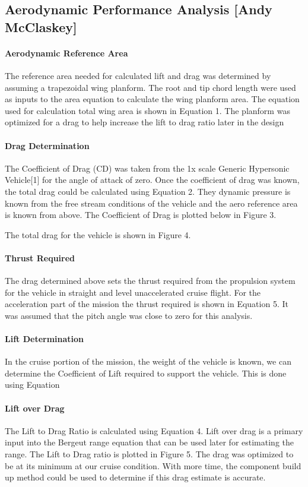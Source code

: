 \subsection{Aerodynamic Performance Analysis [Andy McClaskey]}
\paragraph{Aerodynamic Reference Area}
The reference area needed for calculated lift and drag was determined by assuming a trapezoidal wing planform. The root and tip chord length were used as inputs to the area equation to calculate the wing planform area. The equation used for calculation total wing area is shown in Equation 1.
The planform was optimized for a drag to help increase the lift to drag ratio later in the design

\paragraph{Drag Determination}

The Coefficient of Drag (CD) was taken from the 1x scale Generic Hypersonic Vehicle[1] for the angle of attack of zero. Once the coefficient of drag was known, the total drag could be calculated using Equation 2. They dynamic pressure is known from the free stream conditions of the vehicle and the aero reference area is known from above. The Coefficient of Drag is plotted below in Figure 3.

The total drag for the vehicle is shown in Figure 4.

\paragraph{Thrust Required}
The drag determined above sets the thrust required from the propulsion system for the vehicle in straight and level unaccelerated cruise flight.
For the acceleration part of the mission the thrust required is shown in Equation 5. It was assumed that the pitch angle was close to zero for this analysis.

\paragraph{Lift Determination}
In the cruise portion of the mission, the weight of the vehicle is known, we can determine the Coefficient of Lift required to support the vehicle. This is done using Equation 

\paragraph{Lift over Drag}
The Lift to Drag Ratio is calculated using Equation 4. Lift over drag is a primary input into the Bergeut range equation that can be used later for estimating the range. The Lift to Drag ratio is plotted in Figure 5. The drag was optimized to be at its minimum at our cruise condition. With more time, the component build up method could be used to determine if this drag estimate is accurate.